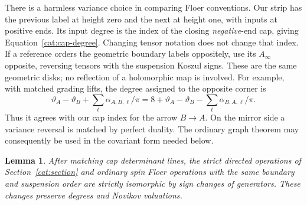 \documentclass[11pt]{article}
\newtheorem{lemma}[theorem]{Lemma}
\theoremstyle{definition}
\theoremstyle{remark}
\newcommand{\Ainf}{A_\infty}
\numberwithin{equation}{section}
\begin{document}
There is a harmless variance choice in comparing Floer conventions.
Our strip has the previous label at height zero and the next at height
one, with inputs at positive ends.  Its input degree is the index of
the closing \emph{negative}-end cap, giving
Equation~\eqref{cat:cap-degree}.  Changing tensor notation does not
change that index.  If a reference orders the geometric boundary
labels oppositely, use its \(\Ainf\) opposite, reversing tensors with
the suspension Koszul signs.  These are the same geometric disks;
no reflection of a holomorphic map is involved.  For example, with
matched grading lifts, the degree assigned to the opposite corner is
\[
 \vartheta_A-\vartheta_B
       +\sum_\ell\alpha_{A,B,\ell}/\pi
 =8+\vartheta_A-\vartheta_B
       -\sum_\ell\alpha_{B,A,\ell}/\pi.
\]
Thus it agrees with our cap index for the arrow \(B\to A\).
On the mirror side a variance reversal is matched by perfect duality.
The ordinary graph theorem may consequently be used in the
covariant form needed below.

\begin{lemma}\label{cat:sign-comparison}
After matching cap determinant lines, the strict directed operations
of Section~\ref{cat:section} and ordinary spin Floer operations with
the same boundary and suspension order are strictly isomorphic by
sign changes of generators.  These changes preserve degrees and
Novikov valuations.
\end{lemma}
\end{document}
